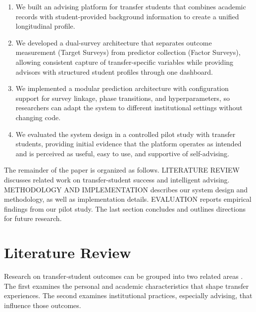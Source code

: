 \documentclass[letterpaper,11pt]{article}
\begin{document}
\begin{enumerate}
    \item We built an advising platform for transfer students that combines academic records with student-provided background information to create a unified longitudinal profile.
    \item We developed a dual-survey architecture that separates outcome measurement (Target Surveys) from predictor collection (Factor Surveys), allowing consistent capture of transfer-specific variables while providing advisors with structured student profiles through one dashboard.
    \item We implemented a modular prediction architecture with configuration support for survey linkage, phase transitions, and hyperparameters, so researchers can adapt the system to different institutional settings without changing code.
    \item We evaluated the system design in a controlled pilot study with transfer students, providing initial evidence that the platform operates as intended and is perceived as useful, easy to use, and supportive of self-advising.
\end{enumerate}

The remainder of the paper is organized as follows. LITERATURE REVIEW discusses related work on transfer-student success and intelligent advising. METHODOLOGY AND IMPLEMENTATION describes our system design and methodology, as well as implementation details. EVALUATION reports empirical findings from our pilot study. The last section concludes and outlines directions for future research.

\section{Literature Review}\label{sec:literature}

Research on transfer-student outcomes can be grouped into two related areas \parencite{factoranalysis2023}. The first examines the personal and academic characteristics that shape transfer experiences. The second examines institutional practices, especially advising, that influence those outcomes.
\end{document}

